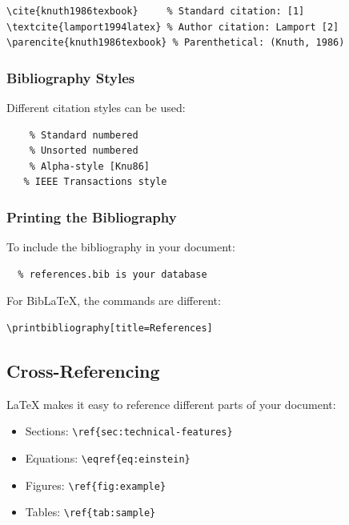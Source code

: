\begin{verbatim}
\cite{knuth1986texbook}     % Standard citation: [1]
\textcite{lamport1994latex} % Author citation: Lamport [2]
\parencite{knuth1986texbook} % Parenthetical: (Knuth, 1986)
\end{verbatim}

\subsubsection{Bibliography Styles}\label{subsubsec:bibliography-styles}
Different citation styles can be used:

\begin{verbatim}
    % Standard numbered
    % Unsorted numbered
    % Alpha-style [Knu86]
   % IEEE Transactions style
\end{verbatim}

\subsubsection{Printing the Bibliography}\label{subsubsec:printing-bibliography}
To include the bibliography in your document:

\begin{verbatim}
  % references.bib is your database
\end{verbatim}

For BibLaTeX, the commands are different:

\begin{verbatim}
\printbibliography[title=References]
\end{verbatim}

\subsection{Cross-Referencing}\label{subsec:cross-referencing}
LaTeX makes it easy to reference different parts of your document:

\begin{itemize}
    \item Sections: \texttt{\textbackslash ref\{sec:technical-features\}}
    \item Equations: \texttt{\textbackslash eqref\{eq:einstein\}}
    \item Figures: \texttt{\textbackslash ref\{fig:example\}}
    \item Tables: \texttt{\textbackslash ref\{tab:sample\}}
\end{itemize}

